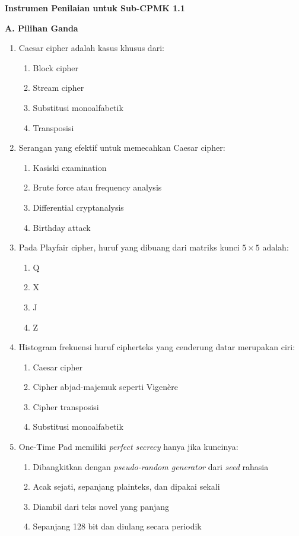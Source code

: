 \documentclass[main.tex]{subfiles}
\begin{document}

\begin{asesmen}
\textbf{Instrumen Penilaian untuk Sub-CPMK 1.1}

\textbf{A. Pilihan Ganda}

\begin{enumerate}
  \item Caesar cipher adalah kasus khusus dari:
  \begin{enumerate}
    \item Block cipher
    \item Stream cipher
    \item Substitusi monoalfabetik
    \item Transposisi
  \end{enumerate}

  \item Serangan yang efektif untuk memecahkan Caesar cipher:
  \begin{enumerate}
    \item Kasiski examination
    \item Brute force atau frequency analysis
    \item Differential cryptanalysis
    \item Birthday attack
  \end{enumerate}

  \item Pada Playfair cipher, huruf yang dibuang dari matriks kunci $5 \times 5$ adalah:
  \begin{enumerate}
    \item Q
    \item X
    \item J
    \item Z
  \end{enumerate}

  \item Histogram frekuensi huruf cipherteks yang cenderung datar merupakan ciri:
  \begin{enumerate}
    \item Caesar cipher
    \item Cipher abjad-majemuk seperti Vigen\`{e}re
    \item Cipher transposisi
    \item Substitusi monoalfabetik
  \end{enumerate}

  \item One-Time Pad memiliki \textit{perfect secrecy} hanya jika kuncinya:
  \begin{enumerate}
    \item Dibangkitkan dengan \textit{pseudo-random generator} dari \textit{seed} rahasia
    \item Acak sejati, sepanjang plainteks, dan dipakai sekali
    \item Diambil dari teks novel yang panjang
    \item Sepanjang 128 bit dan diulang secara periodik
  \end{enumerate}


\end{enumerate}
\end{asesmen}
\end{document}

